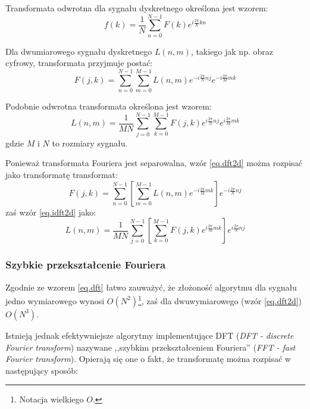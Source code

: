 \documentclass{classrep}
\begin{document}
Transformata odwrotna dla sygnału dyskretnego określona jest wzorem:
\begin{equation}
  \label{eq.idft}
  f(k) =\frac{1}{N} \displaystyle \sum_{n = 0}^{N - 1} F(k) e^{i\frac{2\pi}{N}kn}
\end{equation}

Dla dwumiarowego sygnału dyskretnego $L(n, m)$, takiego jak np. obraz cyfrowy, transformata przyjmuje postać:
\begin{equation}
  \label{eq.dft2d}
  F(j, k) = \displaystyle\sum_{n = 0}^{N - 1} \displaystyle \sum_{m = 0}^{M - 1} L(n, m) e^{-i\frac{2\pi}{N} nj} e^{-i\frac{2\pi}{M}mk}
\end{equation}

Podobnie odwrotna transformata określona jest wzorem:
\begin{equation}
  \label{eq.idft2d}
  L(n, m) = \frac{1}{MN} \displaystyle \sum_{j = 0}^{N - 1} \displaystyle \sum_{k = 0}^{M - 1} F(j, k) e^{i\frac{2\pi}{N} nj} e^{i\frac{2\pi}{M}mk}
\end{equation}
gdzie $M$ i $N$ to rozmiary sygnału.

Ponieważ transformata Fouriera jest separowalna, wzór \ref{eq.dft2d} można rozpisać jako transformatę transformat:
\begin{equation}
  F(j, k) = \displaystyle \sum_{n = 0}^{N - 1} \left[\displaystyle \sum_{m = 0}^{M - 1} L(n, m) e^{-i\frac{2\pi}{M}mk} \right] e^{-i\frac{2\pi}{N} nj}  
\end{equation}
zaś wzór \ref{eq.idft2d} jako:
\begin{equation}
  L(n, m) = \frac{1}{MN} \displaystyle \sum_{j = 0}^{N - 1} \left[\displaystyle \sum_{k = 0}^{M - 1} F(j, k) e^{i\frac{2\pi}{M}mk} \right] e^{i\frac{2\pi}{N} nj}
\end{equation}

\subsubsection{Szybkie przekształcenie Fouriera}
Zgodnie ze wzorem \ref{eq.dft} łatwo zauważyć, że złożoność algorytmu dla sygnału jedno wymiarowego wynosi $O(N^2)$\footnote{Notacja wielkiego $O$.}, zaś dla dwuwymiarowego (wzór \ref{eq.dft2d}) $O(N^3)$.

Istnieją jednak efektywniejsze algorytmy implementujące DFT (\emph{DFT - discrete Fourier transform}) nazywane ,,szybkim przekształceniem Fouriera'' (\emph{FFT - fast Fourier transform}). Opierają się one o fakt, że transformatę można rozpisać w następujący sposób:
\end{document}

